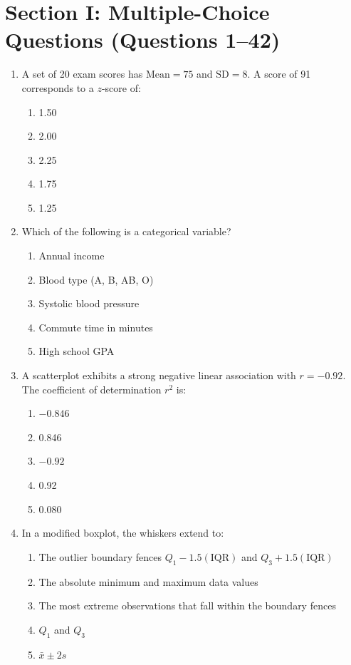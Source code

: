 \section{Section I: Multiple-Choice Questions (Questions 1--42)}
\begin{enumerate}[leftmargin=1.5em]
  \item A set of 20 exam scores has $\text{Mean} = 75$ and $\text{SD} = 8$. A score of 91 corresponds to a $z$-score of:
  \begin{enumerate}[label=(\Alph*)]
    \item 1.50 \item 2.00 \item 2.25 \item 1.75 \item 1.25
  \end{enumerate}

  \item Which of the following is a categorical variable?
  \begin{enumerate}[label=(\Alph*)]
    \item Annual income \item Blood type (A, B, AB, O) \item Systolic blood pressure \item Commute time in minutes \item High school GPA
  \end{enumerate}

  \item A scatterplot exhibits a strong negative linear association with $r = -0.92$. The coefficient of determination $r^2$ is:
  \begin{enumerate}[label=(\Alph*)]
    \item $-0.846$ \item 0.846 \item $-0.92$ \item 0.92 \item 0.080
  \end{enumerate}

  \item In a modified boxplot, the whiskers extend to:
  \begin{enumerate}[label=(\Alph*)]
    \item The outlier boundary fences $Q_1 - 1.5(\text{IQR})$ and $Q_3 + 1.5(\text{IQR})$
    \item The absolute minimum and maximum data values
    \item The most extreme observations that fall within the boundary fences
    \item $Q_1$ and $Q_3$
    \item $\bar{x} \pm 2s$
  \end{enumerate}


\end{enumerate}
